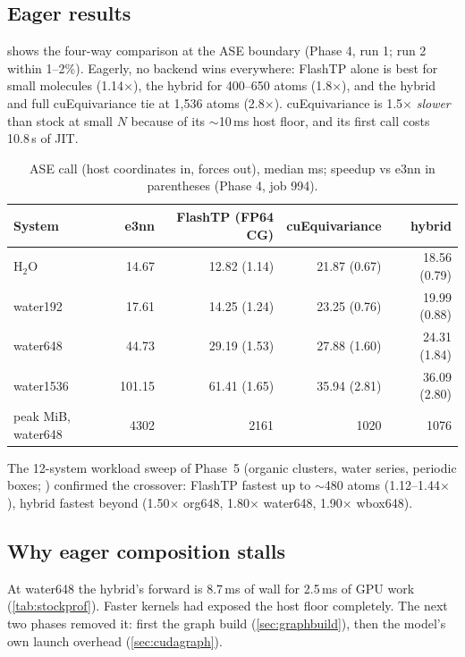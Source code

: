 \subsection{Eager results}
 shows the four-way comparison at the ASE boundary (Phase 4, run 1; run 2 within 1--2\%). Eagerly, no backend wins everywhere: FlashTP alone is best for small molecules (1.14$\times$), the hybrid for 400--650 atoms (1.8$\times$), and the hybrid and full cuEquivariance tie at 1{,}536 atoms (2.8$\times$). cuEquivariance is 1.5$\times$ \emph{slower} than stock at small $N$ because of its $\sim$10\,ms host floor, and its first call costs 10.8\,s of JIT.

\begin{table}[h]
\centering
\caption{ASE call (host coordinates in, forces out), median ms; speedup vs e3nn in parentheses (Phase 4, job 994).}
\label{tab:bench4}
\small
\begin{tabular}{lrrrr}
\toprule
System & e3nn & FlashTP (FP64 CG) & cuEquivariance & hybrid \\
\midrule
H$_2$O & 14.67 & 12.82 (1.14) & 21.87 (0.67) & 18.56 (0.79) \\
water192 & 17.61 & 14.25 (1.24) & 23.25 (0.76) & 19.99 (0.88) \\
water648 & 44.73 & 29.19 (1.53) & 27.88 (1.60) & 24.31 (1.84) \\
water1536 & 101.15 & 61.41 (1.65) & 35.94 (2.81) & 36.09 (2.80) \\
\midrule
peak MiB, water648 & 4302 & 2161 & 1020 & 1076 \\
\bottomrule
\end{tabular}
\end{table}

The 12-system workload sweep of Phase~5 (organic clusters, water series, periodic boxes; ) confirmed the crossover: FlashTP fastest up to $\sim$480 atoms (1.12--1.44$\times$), hybrid fastest beyond (1.50$\times$ org648, 1.80$\times$ water648, 1.90$\times$ wbox648).

\subsection{Why eager composition stalls}
At water648 the hybrid's forward is 8.7\,ms of wall for 2.5\,ms of GPU work (\cref{tab:stockprof}). Faster kernels had exposed the host floor completely. The next two phases removed it: first the graph build (\cref{sec:graphbuild}), then the model's own launch overhead (\cref{sec:cudagraph}).
